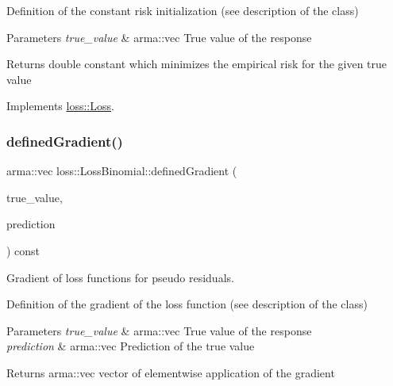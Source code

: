 Definition of the constant risk initialization (see description of the class)


\begin{DoxyParams}{Parameters}
{\em true\+\_\+value} & {\ttfamily arma\+::vec} True value of the response\\
\hline
\end{DoxyParams}
\begin{DoxyReturn}{Returns}
{\ttfamily double} constant which minimizes the empirical risk for the given true value 
\end{DoxyReturn}


Implements \mbox{\hyperlink{classloss_1_1_loss_a65fe7dcd9370e6a549b8d1cc95fc8798}{loss\+::\+Loss}}.

\mbox{\label{classloss_1_1_loss_binomial_a68dcf02e90d09c3658733a9319a85f56}} 
\subsubsection{\texorpdfstring{defined\+Gradient()}{definedGradient()}}
{\footnotesize\ttfamily arma\+::vec loss\+::\+Loss\+Binomial\+::defined\+Gradient (\begin{DoxyParamCaption}\item[{const arma\+::vec \&}]{true\+\_\+value,  }\item[{const arma\+::vec \&}]{prediction }\end{DoxyParamCaption}) const\hspace{0.3cm}{\ttfamily [virtual]}}



Gradient of loss functions for pseudo residuals. 

Definition of the gradient of the loss function (see description of the class)


\begin{DoxyParams}{Parameters}
{\em true\+\_\+value} & {\ttfamily arma\+::vec} True value of the response \\
\hline
{\em prediction} & {\ttfamily arma\+::vec} Prediction of the true value\\
\hline
\end{DoxyParams}
\begin{DoxyReturn}{Returns}
{\ttfamily arma\+::vec} vector of elementwise application of the gradient 
\end{DoxyReturn}


